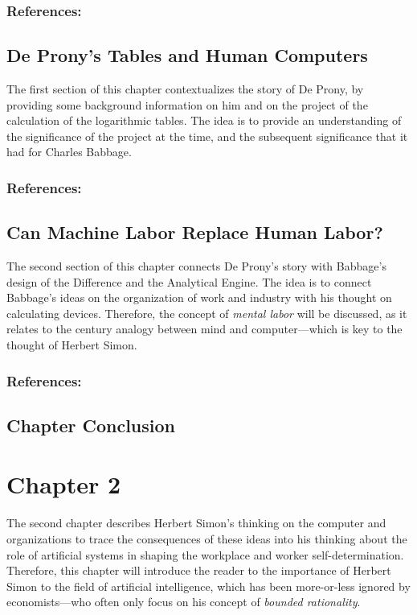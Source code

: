 \documentclass[version=last,draft=false,paper=A4,portrait,twoside=true,twocolumn=true,headinclude=false,footinclude=false,fontsize=12,BCOR=20mm,DIV=13,pagesize=auto,titlepage=false,mpinclude=false,open=right,chapterprefix=true,numbers=autoendperiod,headsepline=false,parskip=false]{scrbook}
\begin{document}
\subsection*{References:}
\printbibliography[heading=none,keyword=chapter-1]
\section{De Prony's Tables and Human Computers}
\label{sec:org604100f}
The first section of this chapter contextualizes the story of De Prony, by
providing some background information on him and on the project of the
calculation of the logarithmic tables. The idea is to provide an
understanding of the significance of the project at the time, and the
subsequent significance that it had for Charles Babbage.

\subsection*{References:}
\printbibliography[heading=none,keyword=chapter-1.1]
\section{Can Machine Labor Replace Human Labor?}
\label{sec:org47eeb70}
The second section of this chapter connects De Prony's story with Babbage's
design of the Difference and the Analytical Engine. The idea is to connect
Babbage's ideas on the organization of work and industry with his thought
on calculating devices. Therefore, the concept of \emph{mental labor} will be
discussed, as it relates to the  century analogy between
mind and computer---which is key to the thought of Herbert Simon.   

\subsection*{References:}
\printbibliography[heading=none,keyword=chapter-1.2]
\section{Chapter Conclusion}
\label{sec:org41cb18c}
\chapter{Chapter 2}
\label{sec:orge6ac0cc}
The second chapter describes Herbert Simon's thinking on the computer and
organizations to trace the consequences of these ideas into his thinking
about the role of artificial systems in shaping the workplace and worker
self-determination. Therefore, this chapter will introduce the reader to
the importance of Herbert Simon to the field of artificial intelligence,
which has been more-or-less ignored by economists---who often only focus on
his concept of \emph{bounded rationality}.
\end{document}
